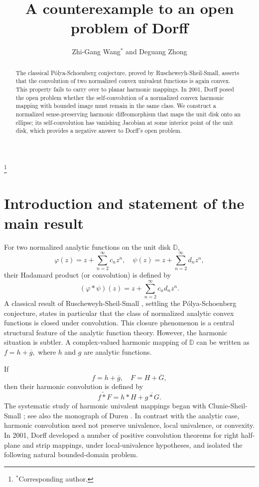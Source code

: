 \documentclass[11pt,reqno]{amsart}
\title[A counterexample to an open problem of Dorff]{A counterexample to an open problem of Dorff}
\author[Zhi-Gang Wang and Deguang Zhong
]{Zhi-Gang Wang$^*$ and Deguang Zhong  
}
\numberwithin{equation}{section}
\theoremstyle{definition}
\theoremstyle{remark}
\newcommand{\convh}{\mathbin{\widetilde *}}
\begin{document}
\begin{abstract}
The classical Pólya-Schoenberg conjecture, proved by Ruscheweyh-Sheil-Small, asserts that the convolution of two normalized convex univalent functions is again convex. This property fails to carry over to planar harmonic mappings. In 2001, Dorff posed the open problem whether the self-convolution of a normalized convex harmonic mapping with bounded image must remain in the same class. We construct a normalized sense-preserving harmonic diffeomorphism that maps the unit disk onto an ellipse; its self‑convolution has vanishing Jacobian at some interior point of the unit disk, which provides a negative answer to Dorff’s open problem.
\end{abstract}

\thanks{$^*$Corresponding author.}
\maketitle

\section{Introduction and statement of the main result}

For two normalized analytic functions on the unit disk \(\mathbb D\),
\[
  \varphi(z)=z+\sum_{n=2}^{\infty}c_nz^n,
  \quad
  \psi(z)=z+\sum_{n=2}^{\infty}d_nz^n,
\] 
their Hadamard product (or convolution) is defined by
\[
  (\varphi*\psi)(z)=z+\sum_{n=2}^{\infty}c_nd_nz^n.
\]
A classical result of Ruscheweyh-Sheil-Small \cite{RuscheweyhSheilSmall1973}, settling the P\'olya-Schoenberg conjecture, states in particular that the class of normalized analytic convex functions is closed under convolution.  This closure phenomenon is a central structural feature of the analytic function theory.
However, the harmonic situation is subtler. A complex-valued harmonic mapping of \(\mathbb D\) can be written as
\(
 f=h+\overline g,
\)
where $h$ and $g$ are analytic functions.  

If
\[
 f=h+\overline g,
 \quad
 F=H+\overline G,
\]
then their harmonic convolution is defined by
\[
  f\convh F=h*H+\overline{g*G}.
\]
The systematic study of harmonic univalent mappings began with Clunie-Sheil-Small \cite{ClunieSheilSmall1984}; see also the monograph of Duren \cite{Duren2004}.  In contrast with the analytic case, harmonic convolution need not preserve univalence, local univalence, or convexity.  In 2001, Dorff \cite{Dorff2001} developed a number of positive convolution theorems for right half-plane and strip mappings, under local-univalence hypotheses, and isolated the following natural bounded-domain problem.
\end{document}

